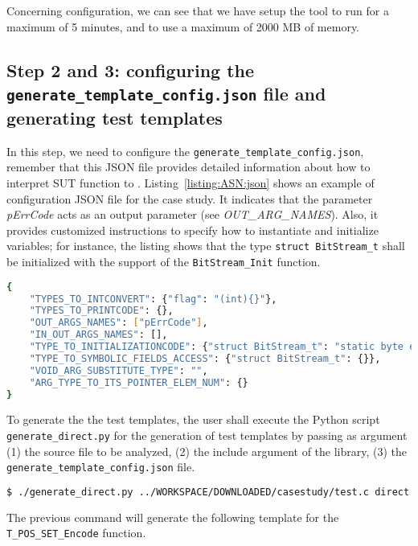 Concerning \SEMU configuration, we can see that we have setup the tool to run for a maximum of 5 minutes, and to use a maximum of 2000 MB of memory.

\subsection{Step 2 and 3: configuring the \texttt{generate\_template\_config.json} file and generating test templates}

In this step, we need to configure the \texttt{generate\_template\_config.json}, remember that this JSON file provides detailed information about how to interpret SUT function to \SEMUS.
Listing~\ref{listing:ASN:json} shows an example of configuration JSON file for the case study.
It indicates that the parameter \emph{pErrCode} acts as an output parameter (see \emph{OUT\_ARG\_NAMES}).
Also, it provides customized instructions to specify how to instantiate and initialize variables; for instance, the listing shows that the type \texttt{struct BitStream\_t} shall be initialized with the support of the \texttt{BitStream\_Init} function.

\begin{lstlisting}[language=bash,label=listing:ASN:json,caption=JSON configuration file for ASN.1.]
{
    "TYPES_TO_INTCONVERT": {"flag": "(int){}"},
    "TYPES_TO_PRINTCODE": {},
    "OUT_ARGS_NAMES": ["pErrCode"],
    "IN_OUT_ARGS_NAMES": [],
    "TYPE_TO_INITIALIZATIONCODE": {"struct BitStream_t": "static byte encBuff[T_POS_SET_REQUIRED_BYTES_FOR_ENCODING + 1];\n\tBitStream_Init(&{}, encBuff, T_POS_SET_REQUIRED_BYTES_FOR_ENCODING)"},
    "TYPE_TO_SYMBOLIC_FIELDS_ACCESS": {"struct BitStream_t": {}},
    "VOID_ARG_SUBSTITUTE_TYPE": "",
    "ARG_TYPE_TO_ITS_POINTER_ELEM_NUM": {}
}
\end{lstlisting}

To generate the the test templates, the user shall execute the Python script \texttt{generate\_direct.py} for the generation of test templates by passing as argument (1) the source file to be analyzed, (2) the include argument of the library, (3) the \texttt{generate\_template\_config.json} file.

\begin{lstlisting}[language=bash]
$ ./generate_direct.py ../WORKSPACE/DOWNLOADED/casestudy/test.c direct " -I../WORKSPACE/DOWNLOADED/casestudy/" -c generate_template_config.json
\end{lstlisting}

The previous command will generate the following template for the \texttt{T\_POS\_SET\_Encode} function.

